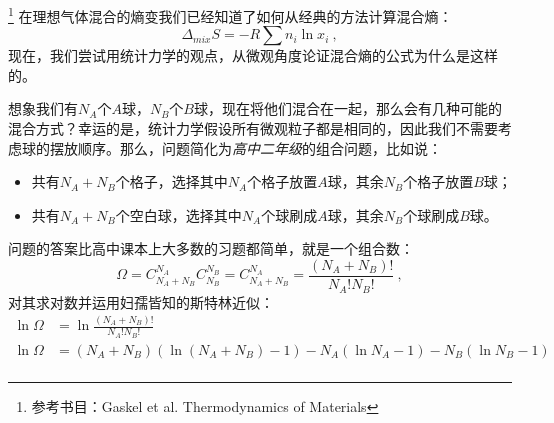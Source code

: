 


\footnote{参考书目：Gaskel et al. Thermodynamics of Materials}
在理想气体混合的熵变我们已经知道了如何从经典的方法计算混合熵：
\begin{equation}
\Delta_{mix} S = - R \sum n_i \ln x_i~,
\end{equation}
现在，我们尝试用统计力学的观点，从微观角度论证混合熵的公式为什么是这样的。

想象我们有$N_A$个$A$球，$N_B$个$B$球，现在将他们混合在一起，那么会有几种可能的混合方式？幸运的是，统计力学假设所有微观粒子都是相同的，因此我们不需要考虑球的摆放顺序。那么，问题简化为\textsl{高中二年级}的组合问题，比如说：
\begin{itemize}
\item 共有$N_A+N_B$个格子，选择其中$N_A$个格子放置$A$球，其余$N_B$个格子放置$B$球；
\item 共有$N_A+N_B$个空白球，选择其中$N_A$个球刷成$A$球，其余$N_B$个球刷成$B$球。
\end{itemize}

问题的答案比高中课本上大多数的习题都简单，就是一个组合数：
\begin{equation}
\Omega = C^{N_A}_{N_A+N_B} C^{N_B}_{N_B} =  C^{N_A}_{N_A+N_B}  = \frac{(N_A+N_B)!}{N_A!N_B!}~,
\end{equation}
对其求对数并运用妇孺皆知的斯特林近似：
\begin{equation}
\begin{aligned}
\ln \Omega &= \ln \frac{(N_A+N_B)!}{N_A!N_B!} \\
\ln \Omega &= (N_A+N_B) (\ln (N_A+N_B) - 1) - N_A (\ln N_A - 1) - N_B (\ln N_B - 1) \\
\end{aligned}

\end{equation}